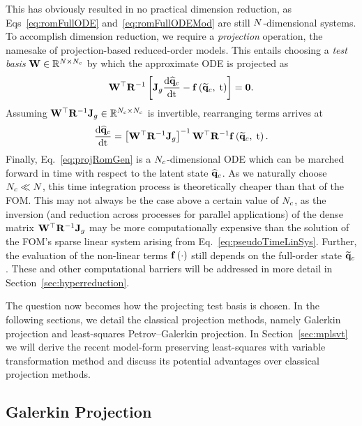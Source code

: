 This has obviously resulted in no practical dimension reduction, as Eqs~\ref{eq:romFullODE} and~\ref{eq:romFullODEMod} are still $N$-dimensional systems. To accomplish dimension reduction, we require a \textit{projection} operation, the namesake of projection-based reduced-order models. This entails choosing a \textit{test basis} $\testBasis \inRTwo{\numDOF}{\numConsModes}$ by which the approximate ODE is projected as
%
\begin{equation}\label{eq:contRomRes}
    \testBasis^\top \resScaleInv \left[\jacobDecode \ode{\consVecCoef}{\timeVar} - \rhsFunc{\consVecRom, \; \timeVar} \right] = \zeroVec.
\end{equation}
%
Assuming $\testBasis^\top \resScaleInv \jacobDecode \inRTwo{\numConsModes}{\numConsModes}$ is invertible, rearranging terms arrives at
%
\begin{equation}\label{eq:projRomGen}
    \ode{\consVecCoef}{\timeVar} = \left[\testBasis^\top \resScaleInv \jacobDecode\right]^{-1} \testBasis^\top \resScaleInv \rhsFunc{\consVecRom, \; \timeVar}.
\end{equation}
%
Finally, Eq.~\ref{eq:projRomGen} is a $N_c$-dimensional ODE which can be marched forward in time with respect to the latent state $\mathbf{\widehat{q}}_{c}$. As we naturally choose $N_c \ll N$, this time integration process is theoretically cheaper than that of the FOM. This may not always be the case above a certain value of $N_c$, as the inversion (and reduction across processes for parallel applications) of the dense matrix $\testBasis^\top \resScaleInv \jacobDecode$ may be more computationally expensive than the solution of the FOM's sparse linear system arising from Eq.~\ref{eq:pseudoTimeLinSys}. Further, the evaluation of the non-linear terms $\mathbf{f} \left(\cdot\right)$ still depends on the full-order state $\mathbf{\widetilde{q}}_{c}$. These and other computational barriers will be addressed in more detail in Section~\ref{sec:hyperreduction}.

The question now becomes how the projecting test basis is chosen. In the following sections, we detail the classical projection methods, namely Galerkin projection and least-squares Petrov--Galerkin projection. In Section~\ref{sec:mplsvt} we will derive the recent model-form preserving least-squares with variable transformation method and discuss its potential advantages over classical projection methods.

\subsection{Galerkin Projection}


